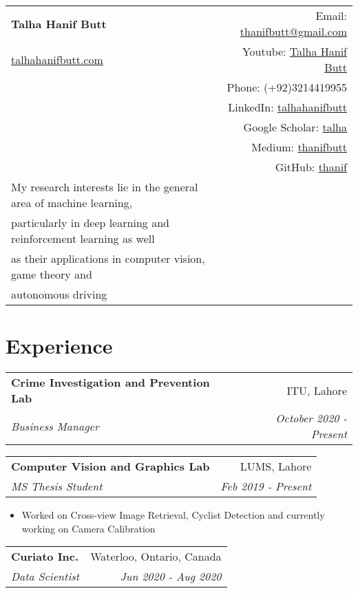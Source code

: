 \documentclass[letterpaper,11pt]{article}
\makeatletter
\newcommand{\resumeSubheading}[4]{
  \vspace{-1pt}\item
    \begin{tabular*}{0.97\textwidth}[t]{l@{\extracolsep{\fill}}r}
      \textbf{#1} & #2 \\
      \textit{\small#3} & \textit{\small #4} \\
    \end{tabular*}\vspace{-5pt}
}
\makeatother
\begin{document}
\begin{tabular*}{\textwidth}{l@{\extracolsep{\fill}}r}
  \textbf{{\Large Talha Hanif Butt}} & Email: \href{mailto:thanifbutt@gmail.com}{thanifbutt@gmail.com}\\
  \href{https://sites.google.com/view/talhahanifbutt}{talhahanifbutt.com}& Youtube: \href{https://www.youtube.com/channel/UCcXj3DvzVAuDrDsO4CvcO6w}{Talha Hanif Butt}\\& Phone: {(+92)3214419955}\\ & LinkedIn: \href{https://pk.linkedin.com/in/talhahanifbutt}{talhahanifbutt}\\
& Google Scholar: \href{https://scholar.google.com/citations?hl=en&user=2OZ4dKsAAAAJ}{talha}\\
& Medium: \href{https://medium.com/@thanifbutt}{thanifbutt}\\  
& GitHub: \href{https://github.com/thanif}{thanif}\\


My research interests lie in the general area of machine learning,\\ particularly in deep learning and reinforcement learning as well\\ as their applications in computer vision, game theory and\\ autonomous driving


\end{tabular*}


\section{Experience}

			\resumeSubheading
      			{Crime Investigation and Prevention Lab}{ITU, Lahore}
      			{Business Manager}{October 2020 - Present}
      
        
          

			\resumeSubheading
      			{Computer Vision and Graphics Lab}{LUMS, Lahore}
      			{MS Thesis Student}{Feb 2019 - Present}
      
        
          \begin{itemize}
  				\item Worked on Cross-view Image Retrieval, Cyclist Detection and currently working on Camera Calibration
			\end{itemize}


			\resumeSubheading
      			{Curiato Inc.}{Waterloo, Ontario, Canada}
      			{Data Scientist}{Jun 2020 - Aug 2020}
      			
\end{document}
